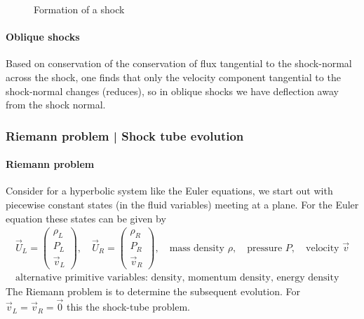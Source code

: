 \begin{figure}
    \centering
    
    \caption{Formation of a shock}
    \label{fig:shock_formation_s}
\end{figure}

\paragraph*{Oblique shocks} Based on conservation of the conservation of flux
tangential to the shock-normal across the shock, one finds that only the velocity
component tangential to the shock-normal changes (reduces), so in oblique shocks
we have deflection away from the shock normal.

\subsubsection*{Riemann problem | Shock tube evolution}
\paragraph*{Riemann problem} Consider for a hyperbolic system like the Euler equations,
we start out with piecewise constant states (in the fluid variables)
meeting at a plane. For the Euler equation these states
can be given by
\begin{equation}
    \begin{gathered}
        \vec{U}_L = \begin{pmatrix} \rho_L \\ P_L \\ \vec{v}_L \end{pmatrix}, \quad \vec{U}_R = \begin{pmatrix} \rho_R \\ P_R \\ \vec{v}_R \end{pmatrix}, \quad \text{mass density } \rho, \quad \text{pressure } P, \quad \text{velocity } \vec{v} \\
        \text{alternative primitive variables: density, momentum density, energy density}
    \end{gathered}  
\end{equation}
The Riemann problem is to determine the subsequent evolution. For $\vec{v}_L = \vec{v}_R = \vec{0}$
this the shock-tube problem.

